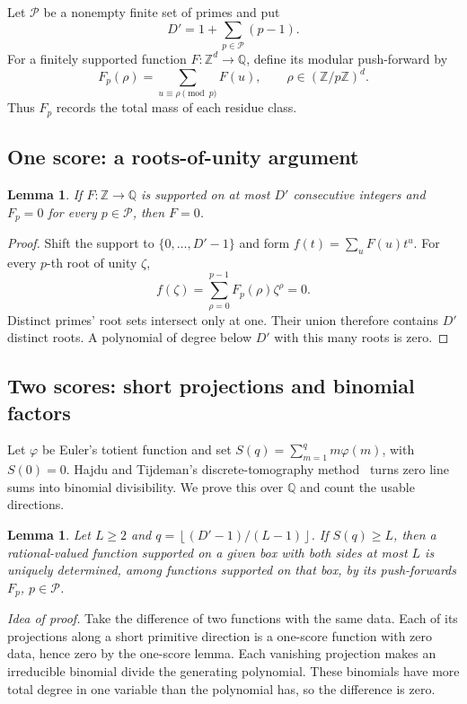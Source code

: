 \documentclass[11pt,letterpaper]{article}
\newtheorem{lemma}[theorem]{Lemma}
\theoremstyle{definition}
\theoremstyle{remark}
\newcommand{\Q}{\mathbb Q}
\newcommand{\Z}{\mathbb Z}
\newcommand{\floor}[1]{\left\lfloor #1\right\rfloor}
\newcommand{\cP}{\mathcal P}
\begin{document}
Let \(\cP\) be a nonempty finite set of primes and put
\[
 D'=1+\sum_{p\in\cP}(p-1).
\]
For a finitely supported function \(F:\Z^d\to\Q\), define its
modular push-forward by
\[
 F_p(\rho)=\sum_{u\equiv\rho\pmod p}F(u),
 \qquad\rho\in(\Z/p\Z)^d.
\]
Thus \(F_p\) records the total mass of each residue class.

\subsection{One score: a roots-of-unity argument}

\begin{lemma}\label{lem:one-window}
If \(F:\Z\to\Q\) is supported on at most \(D'\) consecutive
integers and \(F_p=0\) for every \(p\in\cP\), then \(F=0\).
\end{lemma}
\begin{proof}
Shift the support to \(\{0,\ldots,D'-1\}\) and form
\(f(t)=\sum_uF(u)t^u\). For every \(p\)-th root of unity \(\zeta\),
\[
 f(\zeta)=\sum_{\rho=0}^{p-1}F_p(\rho)\zeta^\rho=0.
\]
Distinct primes' root sets intersect only at one. Their union therefore
contains \(D'\) distinct roots. A polynomial of degree below \(D'\)
with this many roots is zero.
\end{proof}

\subsection{Two scores: short projections and binomial factors}

Let \(\varphi\) be Euler's totient function and set
\(S(q)=\sum_{m=1}^q m\varphi(m)\), with \(S(0)=0\).
Hajdu and Tijdeman's discrete-tomography method~\cite[Theorem~1 and
its preliminary divisibility lemma]{HT01} turns zero line sums into
binomial divisibility. We prove this over \(\Q\) and count the usable
directions.

\begin{lemma}\label{lem:two-window}
Let \(L\ge2\) and
\(q=\floor{(D'-1)/(L-1)}\). If \(S(q)\ge L\), then a
rational-valued function supported on a given box with both sides at
most \(L\) is uniquely determined, among functions supported on that
box, by its push-forwards \(F_p\), \(p\in\cP\).
\end{lemma}

\emph{Idea of proof.} Take the difference of two functions with the
same data. Each of its projections along a short primitive direction is
a one-score function with zero data, hence zero by the one-score lemma.
Each vanishing projection makes an irreducible binomial divide the
generating polynomial. These binomials have more total degree in one
variable than the polynomial has, so the difference is zero.
\end{document}
